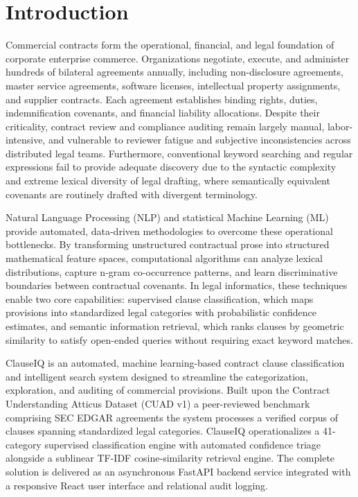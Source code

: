 \chapter{Introduction}
\label{ch:introduction}

Commercial contracts form the operational, financial, and legal foundation of corporate enterprise commerce. Organizations negotiate, execute, and administer hundreds of bilateral agreements annually, including non-disclosure agreements, master service agreements, software licenses, intellectual property assignments, and supplier contracts. Each agreement establishes binding rights, duties, indemnification covenants, and financial liability allocations. Despite their criticality, contract review and compliance auditing remain largely manual, labor-intensive, and vulnerable to reviewer fatigue and subjective inconsistencies across distributed legal teams. Furthermore, conventional keyword searching and regular expressions fail to provide adequate discovery due to the syntactic complexity and extreme lexical diversity of legal drafting, where semantically equivalent covenants are routinely drafted with divergent terminology.

Natural Language Processing (NLP) and statistical Machine Learning (ML) provide automated, data-driven methodologies to overcome these operational bottlenecks. By transforming unstructured contractual prose into structured mathematical feature spaces, computational algorithms can analyze lexical distributions, capture n-gram co-occurrence patterns, and learn discriminative boundaries between contractual covenants. In legal informatics, these techniques enable two core capabilities: supervised clause classification, which maps provisions into standardized legal categories with probabilistic confidence estimates, and semantic information retrieval, which ranks clauses by geometric similarity to satisfy open-ended queries without requiring exact keyword matches.

ClauseIQ is an automated, machine learning-based contract clause classification and intelligent search system designed to streamline the categorization, exploration, and auditing of commercial provisions. Built upon the Contract Understanding Atticus Dataset (CUAD v1) a peer-reviewed benchmark comprising \TotalContracts{} SEC EDGAR agreements the system processes a verified corpus of \TotalClauses{} clauses spanning \NumClasses{} standardized legal categories. ClauseIQ operationalizes a 41-category supervised classification engine with automated confidence triage alongside a sublinear TF-IDF cosine-similarity retrieval engine. The complete solution is delivered as an asynchronous FastAPI backend service integrated with a responsive React user interface and relational audit logging.


